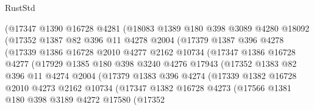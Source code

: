 \begin{lexlean}{RustStd}
\begin{coremodule}
                  (@17347
                    @1390
                    @16728
                    @4281
                    (@18083
                      @1389
                      @180
                      @398
                      @3089
                      @4280
                      @18092
                      (@17352
                        @1387
                        @82
                        @396
                        @11
                        @4278
                        @2004
                        (@17379
                          @1387
                          @396
                          @4278
                          (@17339
                            @1386
                            @16728
                            @2010
                            @4277
                            @2162
                            @10734
                            (@17347
                              @1386
                              @16728
                              @4277
                              (@17929
                                @1385
                                @180
                                @398
                                @3240
                                @4276
                                @17943
                                (@17352
                                  @1383
                                  @82
                                  @396
                                  @11
                                  @4274
                                  @2004
                                  (@17379
                                    @1383
                                    @396
                                    @4274
                                    (@17339
                                      @1382
                                      @16728
                                      @2010
                                      @4273
                                      @2162
                                      @10734
                                      (@17347
                                        @1382
                                        @16728
                                        @4273
                                        (@17566
                                          @1381
                                          @180
                                          @398
                                          @3189
                                          @4272
                                          @17580
                                          (@17352

\end{coremodule}
\end{lexlean}
